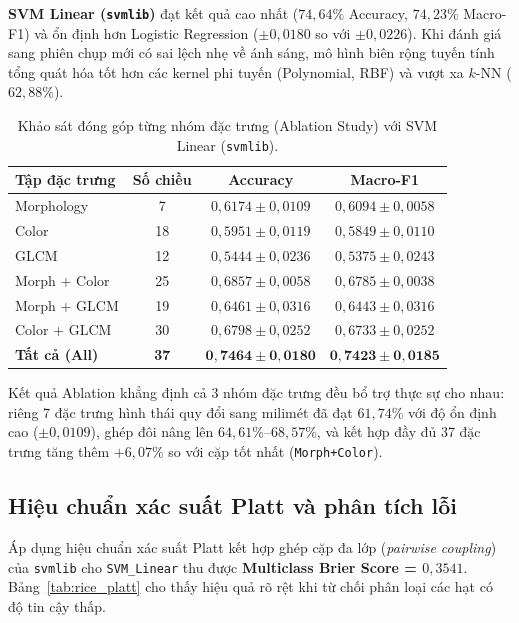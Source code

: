 \textbf{SVM Linear (\texttt{svmlib})} đạt kết quả cao nhất ($74{,}64\%$ Accuracy, $74{,}23\%$ Macro-F1) và ổn định hơn Logistic Regression ($\pm 0{,}0180$ so với $\pm 0{,}0226$). Khi đánh giá sang phiên chụp mới có sai lệch nhẹ về ánh sáng, mô hình biên rộng tuyến tính tổng quát hóa tốt hơn các kernel phi tuyến (Polynomial, RBF) và vượt xa $k$-NN ($62{,}88\%$).

\begin{table}[htbp]
    \centering
    \caption{Khảo sát đóng góp từng nhóm đặc trưng (Ablation Study) với SVM Linear (\texttt{svmlib}).}
    \label{tab:rice_ablation}
    \begin{tabular}{lccc}
        \hline
        \textbf{Tập đặc trưng} & \textbf{Số chiều} & \textbf{Accuracy} & \textbf{Macro-F1} \\
        \hline
        Morphology & 7  & $0{,}6174 \pm 0{,}0109$ & $0{,}6094 \pm 0{,}0058$ \\
        Color      & 18 & $0{,}5951 \pm 0{,}0119$ & $0{,}5849 \pm 0{,}0110$ \\
        GLCM       & 12 & $0{,}5444 \pm 0{,}0236$ & $0{,}5375 \pm 0{,}0243$ \\
        Morph + Color & 25 & $0{,}6857 \pm 0{,}0058$ & $0{,}6785 \pm 0{,}0038$ \\
        Morph + GLCM  & 19 & $0{,}6461 \pm 0{,}0316$ & $0{,}6443 \pm 0{,}0316$ \\
        Color + GLCM  & 30 & $0{,}6798 \pm 0{,}0252$ & $0{,}6733 \pm 0{,}0252$ \\
        \textbf{Tất cả (All)} & \textbf{37} & $\mathbf{0{,}7464 \pm 0{,}0180}$ & $\mathbf{0{,}7423 \pm 0{,}0185}$ \\
        \hline
    \end{tabular}
\end{table}

Kết quả Ablation khẳng định cả 3 nhóm đặc trưng đều bổ trợ thực sự cho nhau: riêng 7 đặc trưng hình thái quy đổi sang milimét đã đạt $61{,}74\%$ với độ ổn định cao ($\pm 0{,}0109$), ghép đôi nâng lên $64{,}61\%$--$68{,}57\%$, và kết hợp đầy đủ 37 đặc trưng tăng thêm $+6{,}07\%$ so với cặp tốt nhất (\texttt{Morph+Color}).

\subsection{Hiệu chuẩn xác suất Platt và phân tích lỗi}
Áp dụng hiệu chuẩn xác suất Platt kết hợp ghép cặp đa lớp (\textit{pairwise coupling}) của \texttt{svmlib} cho \texttt{SVM\_Linear} thu được \textbf{Multiclass Brier Score = $0{,}3541$}. Bảng~\ref{tab:rice_platt} cho thấy hiệu quả rõ rệt khi từ chối phân loại các hạt có độ tin cậy thấp.

